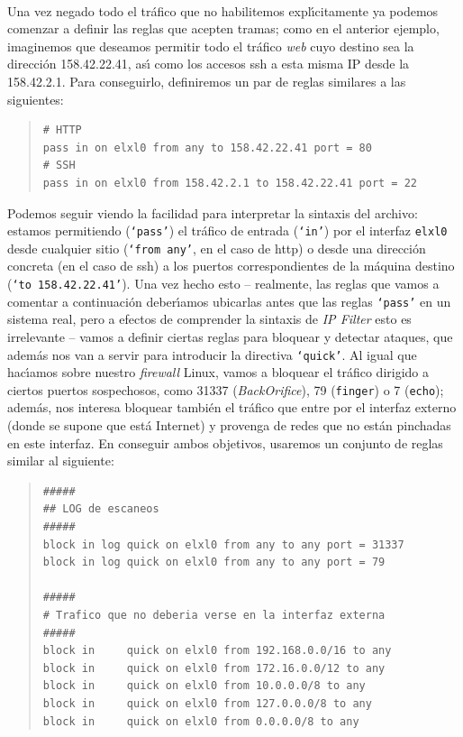 \\Una vez negado todo el tr\'afico que no habilitemos expl\'{\i}citamente ya
podemos comenzar a definir las reglas que acepten tramas; como en el anterior
ejemplo, imaginemos que deseamos permitir todo el tr\'afico {\it web} cuyo
destino sea la direcci\'on 158.42.22.41, as\'{\i} como los accesos {\sc ssh}
a esta misma IP desde la 158.42.2.1. Para conseguirlo, definiremos un par de
reglas similares a las siguientes:
\begin{quote}
\begin{verbatim}
# HTTP
pass in on elxl0 from any to 158.42.22.41 port = 80
# SSH
pass in on elxl0 from 158.42.2.1 to 158.42.22.41 port = 22
\end{verbatim}
\end{quote}
Podemos seguir viendo la facilidad para interpretar la sintaxis del archivo:
estamos permitiendo ({\tt `pass'}) el tr\'afico de entrada ({\tt `in'}) por
el interfaz {\tt elxl0} desde cualquier sitio ({\tt `from any'}, en el caso de
{\sc http}) o desde una direcci\'on concreta (en el caso de {\sc ssh}) a los 
puertos correspondientes de la m\'aquina destino ({\tt `to 158.42.22.41'}). Una
vez hecho esto -- realmente, las reglas que vamos a comentar a continuaci\'on 
deber\'{\i}amos ubicarlas antes que las reglas {\tt `pass'} en un sistema real,
pero a efectos de comprender la sintaxis de {\it IP Filter} esto es irrelevante
-- vamos a definir ciertas reglas para bloquear y detectar ataques, que
adem\'as nos van a servir para introducir la directiva {\tt `quick'}. Al igual
que hac\'{\i}amos sobre nuestro {\it firewall} Linux, vamos a bloquear el
tr\'afico dirigido a ciertos puertos sospechosos, como 31337 
({\it BackOrifice}), 79 ({\tt finger}) o 7 ({\tt echo}); adem\'as, nos
interesa bloquear tambi\'en el tr\'afico que entre por el interfaz externo 
(donde se supone que est\'a Internet) y provenga de redes que no est\'an 
pinchadas en este interfaz. En conseguir ambos objetivos, usaremos un conjunto 
de reglas similar al siguiente:
\begin{quote}
\begin{verbatim}
#####
## LOG de escaneos
#####
block in log quick on elxl0 from any to any port = 31337
block in log quick on elxl0 from any to any port = 79

#####
# Trafico que no deberia verse en la interfaz externa
#####
block in     quick on elxl0 from 192.168.0.0/16 to any
block in     quick on elxl0 from 172.16.0.0/12 to any
block in     quick on elxl0 from 10.0.0.0/8 to any
block in     quick on elxl0 from 127.0.0.0/8 to any
block in     quick on elxl0 from 0.0.0.0/8 to any
\end{verbatim}
\end{quote}
